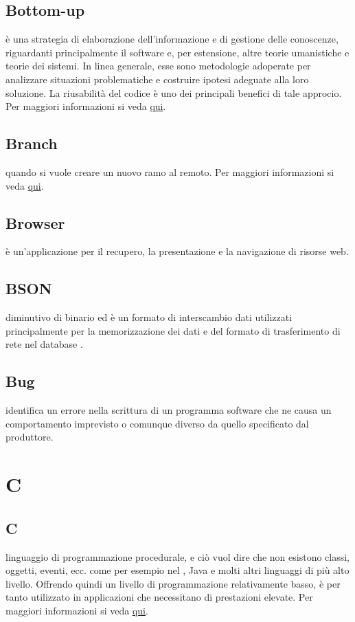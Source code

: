 \documentclass[12pt,a4paper]{article}
\begin{document}
\subsection{Bottom-up}
è una strategia di elaborazione dell'informazione e di gestione delle conoscenze, riguardanti principalmente il software e, per estensione, altre teorie umanistiche e teorie dei sistemi. In linea generale, esse sono metodologie adoperate per analizzare situazioni problematiche e costruire ipotesi adeguate alla loro soluzione. La riusabilità del codice è uno dei principali benefici di tale approcio. Per maggiori informazioni si veda \href{https://it.wikipedia.org/wiki/Progettazione_top-down_e_bottom-up}{qui}.

\subsection{Branch}
 quando si vuole creare un nuovo ramo al  remoto. Per maggiori informazioni si veda \href{https://git-scm.com/docs/}{qui}.

\subsection{Browser}
 è un'applicazione per il recupero, la presentazione e la navigazione di risorse web.

\subsection{BSON}
 diminutivo di  binario ed è un formato di interscambio dati utilizzati principalmente per la memorizzazione dei dati e del formato di trasferimento di rete nel database .

\subsection{Bug}
 identifica un errore nella scrittura di un programma software che ne causa un comportamento imprevisto o comunque diverso da quello specificato dal produttore.


\newpage

\section{C}


\subsection{C}
 linguaggio di programmazione procedurale, e ciò vuol dire che non esistono classi, oggetti, eventi, ecc. come per esempio nel , Java e molti altri linguaggi di più alto livello. Offrendo quindi un livello di programmazione relativamente basso, è per tanto utilizzato in applicazioni che necessitano di prestazioni elevate. Per maggiori informazioni si veda \href{https://it.wikiversity.org/wiki/Linguaggio_C}{qui}.
\end{document}
